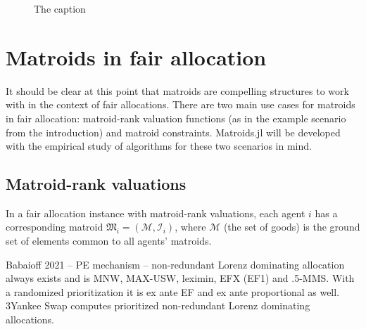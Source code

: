 \begin{figure}
{
  }
  \caption{The caption}
\end{figure}


\section{Matroids in fair allocation}
It should be clear at this point that matroids are compelling structures to work with in the context of fair allocations. There are two main use cases for matroids in fair allocation: matroid-rank valuation functions (as in the example scenario from the introduction) and matroid constraints. Matroids.jl will be developed with the empirical study of algorithms for these two scenarios in mind.

\subsection{Matroid-rank valuations}
In a fair allocation instance with matroid-rank valuations, each agent $i$ has a corresponding matroid $\mathfrak{M}_i = (\mathcal{M}, \mathcal{I}_i)$, where $\mathcal{M}$ (the set of goods) is the ground set of elements common to all agents' matroids.

Babaioff 2021 -- PE mechanism -- non-redundant Lorenz dominating allocation always exists and is MNW, MAX-USW, leximin, EFX (EF1) and .5-MMS. With a randomized prioritization it is ex ante EF and ex ante proportional as well. 3Yankee Swap computes prioritized non-redundant Lorenz dominating allocations.



